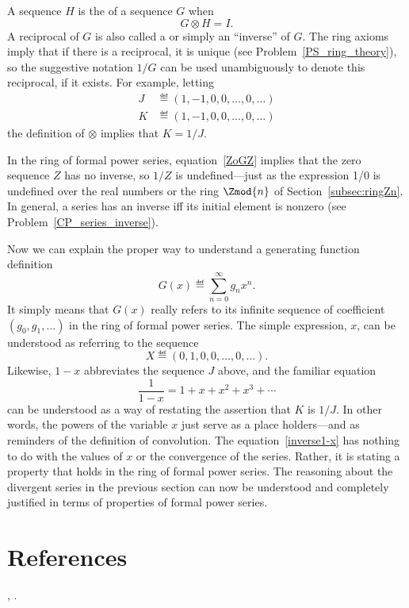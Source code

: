 A sequence $H$ is the  of a sequence $G$ when
\[
G \otimes H = I.
\]
A reciprocal of $G$ is also called a  or
simply an ``inverse'' of $G$.  The ring axioms imply that if there is
a reciprocal, it is unique (see Problem~\ref{PS_ring_theory}), so the
suggestive notation $1/G$ can be used unambiguously to denote this
reciprocal, if it exists.  For example, letting
\begin{align*}
J & \eqdef (1,-1,0,0,\dots,0,\dots)\\
K & \eqdef (1,-1,0,0,\dots,0,\dots)
\end{align*}
the definition of $\otimes$ implies that $K = 1/J$.

In the ring of formal power series, equation~\eqref{ZoGZ} implies that
the zero sequence $Z$ has no inverse, so $1/Z$ is undefined---just as
the expression 1/0 is undefined over the real numbers or the ring
$\Zmod{n}$ of Section~\ref{subsec:ringZn}.  In general, a series has
an inverse iff its initial element is nonzero (see
Problem~\ref{CP_series_inverse}).

Now we can explain the proper way to understand a generating function
definition
\[
G(x) \eqdef \sum_{n=0}^\infty g_n x^n.
\]
It simply means that $G(x)$ really refers to its infinite sequence of
coefficient $(g_0,g_1,\dots)$ in the ring of formal power series.  The
simple expression, $x$, can be understood as referring to the sequence
\[
X \eqdef (0,1,0,0,\dots,0,\dots).
\]
Likewise, $1-x$ abbreviates the sequence $J$ above, and the familiar
equation
\begin{equation}\label{inverse1-x}
\frac{1}{1-x} = 1 + x + x^2 + x^3 + \cdots
\end{equation}
can be understood as a way of restating the assertion that $K$ is
$1/J$.  In other words, the powers of the variable $x$ just serve as a
place holders---and as reminders of the definition of convolution.
The equation~\eqref{inverse1-x} has nothing to do with the values of
$x$ or the convergence of the series.  Rather, it is stating a
property that holds in the ring of formal power series.  The reasoning
about the divergent series in the previous section can now be
understood and completely justified in terms of properties of formal
power series.

\begin{problems}
\practiceproblems
{}

\classproblems
{}
\end{problems}

\section{References}
\cite{Wilf1990}, \cite{GrahamKP1994}.
\endinput
